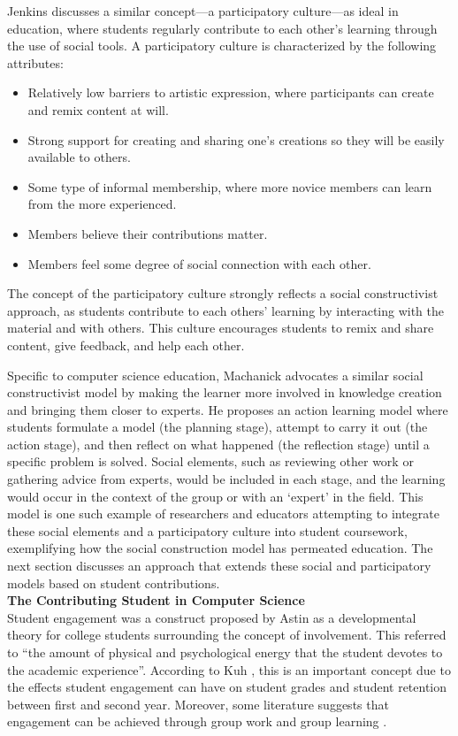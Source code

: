Jenkins \cite{jenkins2009confronting} discusses a similar concept---a participatory culture---as ideal in education, where students regularly contribute to each other's learning through the use of social tools. A participatory culture is characterized by the following attributes:

\begin{itemize}
\item Relatively low barriers to artistic expression, where participants can create and remix content at will.
\item Strong support for creating and sharing one's creations so they will be easily available to others.
\item Some type of informal membership, where more novice members can learn from the more experienced.
\item Members believe their contributions matter.
\item Members feel some degree of social connection with each other.
\end{itemize}

The concept of the participatory culture strongly reflects a social constructivist approach, as students contribute to each others' learning by interacting with the material and with others. This culture encourages students to remix and share content, give feedback, and help each other.

Specific to computer science education, Machanick \cite{machanick2007social} advocates a similar social constructivist model by making the learner more involved in knowledge creation and bringing them closer to experts. He proposes an action learning model where students formulate a model (the planning stage), attempt to carry it out (the action stage), and then reflect on what happened (the reflection stage) until a specific problem is solved. Social elements, such as reviewing other work or gathering advice from experts, would be included in each stage, and the learning would occur in the context of the group or with an `expert' in the field. This model is one such example of researchers and educators attempting to integrate these social elements and a participatory culture into student coursework, exemplifying how the social construction model has permeated education. The next section discusses an approach that extends these social and participatory models based on student contributions. \\

\textbf{The Contributing Student in Computer Science} \\
Student engagement was a construct proposed by Astin \cite{astin1984student} as a developmental theory for college students surrounding the concept of involvement. This referred to ``the amount of physical and psychological energy that the student devotes to the academic experience''. According to Kuh \cite{kuh2001assessing}, this is an important concept due to the effects student engagement can have on student grades and student retention between first and second year. Moreover, some literature suggests that engagement can be achieved through group work and group learning \cite{bower2007groupwork}.

